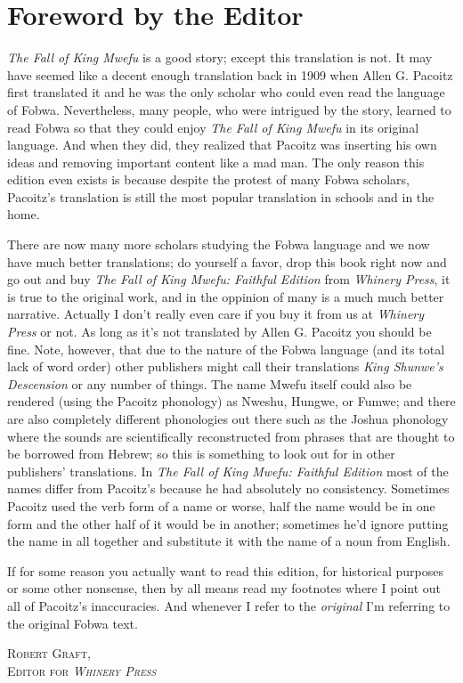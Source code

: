 \documentclass[openany, twoside, 12pt, extrafontsizes]{memoir}
\begin{document}
\chapter*{Foreword by the Editor}
\emph{The Fall of King Mwefu} is a good story; except this translation is not.
It may have seemed like a decent enough translation back in 1909 when Allen G. Pacoitz first translated it and he was the only scholar who could even read the language of Fo\-bwa.
Nevertheless, many people, who were intrigued by the story, learned to read Fo\-bwa so that they could enjoy \emph{The Fall of King Mwefu} in its original language.
And when they did, they realized that Pacoitz was inserting his own ideas and removing important content like a mad man.
The only reason this edition even exists is because despite the protest of many Fo\-bwa scholars, Pacoitz's translation is still the most popular translation in schools and in the home. 

There are now many more scholars studying the Fo\-bwa language and we now have much better translations;
do yourself a favor, drop this book right now and go out and buy \emph{The Fall of King Mwefu: Faithful Edition} from \emph{Whinery Press}, it is true to the original work, and in the oppinion of many is a much much better narrative.
Actually I don't really even care if you buy it from us at \emph{Whinery Press} or not.
As long as it's not translated by Allen G. Pacoitz you should be fine.
Note, however, that due to the nature of the Fo\-bwa language (and its total lack of word order) other publishers might call their translations \emph{King Shunwe's Descension} or any number of things. The name Mwefu itself could also be rendered (using the Pacoitz phonology) as Nweshu, Hungwe, or Fumwe; and there are also completely different phonologies out there such as the Joshua phonology where the sounds are scientifically reconstructed from phrases that are thought to be borrowed from Hebrew; so this is something to look out for in other publishers' translations. In \emph{The Fall of King Mwefu: Faithful Edition} most of the names differ from Pacoitz's because he had absolutely no consistency. Sometimes Pacoitz used the verb form of a name or worse, half the name would be in one form and the other half of it would be in another; sometimes he'd ignore putting the name in all together and substitute it with the name of a noun from English.

If for some reason you actually want to read this edition, for historical purposes or some other nonsense, then by all means read my footnotes where I point out all of Pacoitz's inaccuracies. And whenever I refer to the \emph{original} I'm referring to the original Fo\-bwa text.
\begin{flushright}
\textsc{
Robert Graft,\\
Editor for \emph{Whinery Press}}
\clearpage
\end{flushright}

\tableofcontents
\mainmatter












\addappheadtotoc
\appendix
\appendixpage

\end{document}
